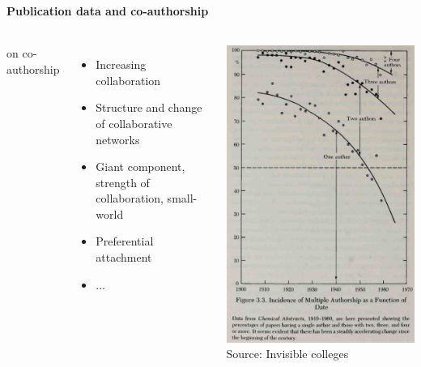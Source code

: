 \documentclass[8pt]{beamer}
\begin{document}
\begin{frame}
\frametitle{\insertsection}
\framesubtitle{Publication data and co-authorship}

\begin{columns}[c]

{\color{blue}{Pioneering studies}} on co-authorship
\begin{itemize}
\item Increasing collaboration \cite{DeSollaPrice1963}
\item Structure and change of collaborative networks \cite{Melin1996}
\item Giant component, strength of collaboration, small-world \cite{Newman2001a}
\item Preferential attachment \cite{Albert2002}
\item ...
\end{itemize}

\centering
\includegraphics[height=0.8\textheight]{invisible_college}\\     
\tiny{Source: Invisible colleges \cite{DeSollaPrice1963}}

\end{columns}


\end{frame}
\end{document}
